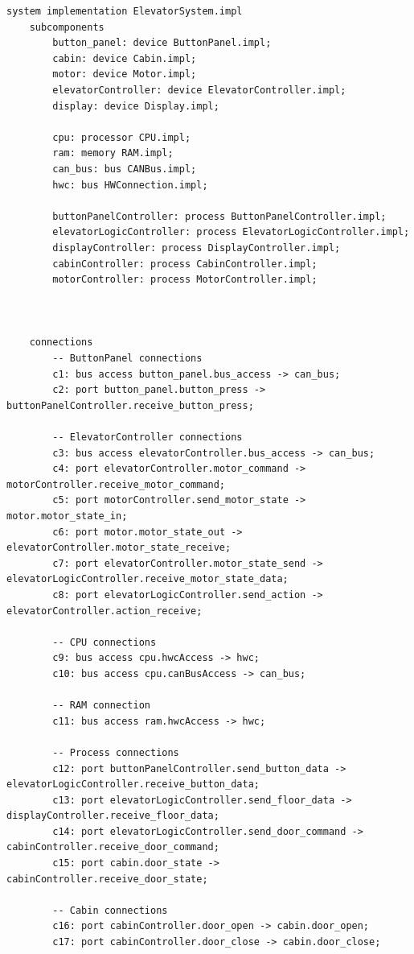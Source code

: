 \documentclass{article}
\begin{document}
    \begin{lstlisting}[basicstyle=\ttfamily, keywordstyle=\bfseries]
system implementation ElevatorSystem.impl
    subcomponents
        button_panel: device ButtonPanel.impl;
        cabin: device Cabin.impl;
        motor: device Motor.impl;
        elevatorController: device ElevatorController.impl;
        display: device Display.impl;

        cpu: processor CPU.impl;
        ram: memory RAM.impl;
        can_bus: bus CANBus.impl;
        hwc: bus HWConnection.impl;

        buttonPanelController: process ButtonPanelController.impl;
        elevatorLogicController: process ElevatorLogicController.impl;
        displayController: process DisplayController.impl;
        cabinController: process CabinController.impl;
        motorController: process MotorController.impl;
    
    

    connections
        -- ButtonPanel connections
        c1: bus access button_panel.bus_access -> can_bus;
        c2: port button_panel.button_press -> buttonPanelController.receive_button_press;
    
        -- ElevatorController connections
        c3: bus access elevatorController.bus_access -> can_bus;
        c4: port elevatorController.motor_command -> motorController.receive_motor_command;
        c5: port motorController.send_motor_state -> motor.motor_state_in;
        c6: port motor.motor_state_out -> elevatorController.motor_state_receive;
        c7: port elevatorController.motor_state_send -> elevatorLogicController.receive_motor_state_data;
        c8: port elevatorLogicController.send_action -> elevatorController.action_receive;  
    
        -- CPU connections
        c9: bus access cpu.hwcAccess -> hwc;
        c10: bus access cpu.canBusAccess -> can_bus;
    
        -- RAM connection
        c11: bus access ram.hwcAccess -> hwc;
    
        -- Process connections
        c12: port buttonPanelController.send_button_data -> elevatorLogicController.receive_button_data;
        c13: port elevatorLogicController.send_floor_data -> displayController.receive_floor_data;
        c14: port elevatorLogicController.send_door_command -> cabinController.receive_door_command;
        c15: port cabin.door_state -> cabinController.receive_door_state;
    
        -- Cabin connections
        c16: port cabinController.door_open -> cabin.door_open;
        c17: port cabinController.door_close -> cabin.door_close;
    

\end{lstlisting}
\end{document}
